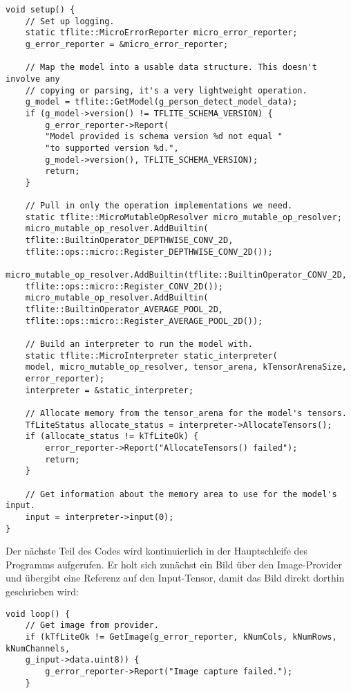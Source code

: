 \begin{code}
    \begin{lstlisting}
void setup() {
    // Set up logging.
    static tflite::MicroErrorReporter micro_error_reporter;
    g_error_reporter = &micro_error_reporter;
    
    // Map the model into a usable data structure. This doesn't involve any
    // copying or parsing, it's a very lightweight operation.
    g_model = tflite::GetModel(g_person_detect_model_data);
    if (g_model->version() != TFLITE_SCHEMA_VERSION) {
        g_error_reporter->Report(
        "Model provided is schema version %d not equal "
        "to supported version %d.",
        g_model->version(), TFLITE_SCHEMA_VERSION);
        return;
    }
    
    // Pull in only the operation implementations we need.
    static tflite::MicroMutableOpResolver micro_mutable_op_resolver;
    micro_mutable_op_resolver.AddBuiltin(
    tflite::BuiltinOperator_DEPTHWISE_CONV_2D,
    tflite::ops::micro::Register_DEPTHWISE_CONV_2D());
    micro_mutable_op_resolver.AddBuiltin(tflite::BuiltinOperator_CONV_2D,
    tflite::ops::micro::Register_CONV_2D());
    micro_mutable_op_resolver.AddBuiltin(
    tflite::BuiltinOperator_AVERAGE_POOL_2D,
    tflite::ops::micro::Register_AVERAGE_POOL_2D());
    
    // Build an interpreter to run the model with.
    static tflite::MicroInterpreter static_interpreter(
    model, micro_mutable_op_resolver, tensor_arena, kTensorArenaSize,
    error_reporter);
    interpreter = &static_interpreter;
    
    // Allocate memory from the tensor_arena for the model's tensors.
    TfLiteStatus allocate_status = interpreter->AllocateTensors();
    if (allocate_status != kTfLiteOk) {
        error_reporter->Report("AllocateTensors() failed");
        return;
    }
    
    // Get information about the memory area to use for the model's input.
    input = interpreter->input(0);
}
  \end{lstlisting}
\end{code}

Der nächste Teil des Codes wird kontinuierlich in der Hauptschleife des Programms aufgerufen. Er holt sich zunächst ein Bild über den Image-Provider und übergibt eine Referenz auf den Input-Tensor, damit das Bild direkt dorthin geschrieben wird:

\begin{code}
    \begin{lstlisting}
void loop() {
    // Get image from provider.
    if (kTfLiteOk != GetImage(g_error_reporter, kNumCols, kNumRows, kNumChannels,
    g_input->data.uint8)) {
        g_error_reporter->Report("Image capture failed.");
    }
  \end{lstlisting}
\end{code}


